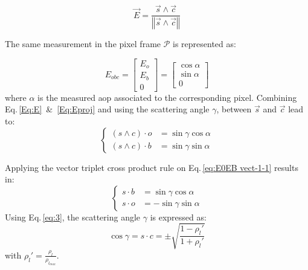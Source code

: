 \begin{equation}
\vec{E}=\frac{\vec{s}\wedge \vec{c}}{\left\Vert \vec{s}\wedge
    \vec{c}\right\Vert }
\label{Eq:E}
\end{equation}

The same measurement in the pixel frame $\mathcal{P}$ is represented as:

\begin{equation}
E_{obc}=\left[\begin{array}{c}
E_{o}\\
E_{b}\\
0
\end{array}\right]=\left[\begin{array}{c}
\cos\alpha\\
\sin\alpha\\
0
\end{array}\right]
\label{Eq:Eproj}
\end{equation}
\noindent where $\alpha$ is the measured \gls{aop} associated to the corresponding pixel.
Combining Eq.\,\eqref{Eq:E}~\&~\eqref{Eq:Eproj} and using the
scattering angle $\gamma$, between $\vec{s}$ and $\vec{c}$ lead to:
\begin{equation}
  \begin{cases}
(s\wedge c)\cdot o & =\sin\gamma\cos\alpha\\
(s\wedge c)\cdot b & =\sin\gamma\sin\alpha
\end{cases}
\label{eq:E0EB vect-1-1}
\end{equation}

Applying the vector triplet cross product rule on Eq.\,\eqref{eq:E0EB
  vect-1-1} results in:
\begin{equation}
\begin{cases}
s\cdot b & =\sin\gamma\cos\alpha\\
s\cdot o & =-\sin\gamma\sin\alpha
\end{cases}
\label{eq:scal-b-o}
\end{equation}
Using Eq.\,\eqref{eq:3}, the scattering angle $\gamma$ is expressed as:
\begin{equation}
\cos\gamma=s\cdot c=\pm\sqrt{\frac{1-\rho_{l}'}{1+\rho_{l}'}}
\label{Eq:cosg}
\end{equation}
\noindent with $\rho_{l}'=\frac{\rho_{l}}{\rho_{l_{max}}}.$ \\
\vspace{0.4mm}

